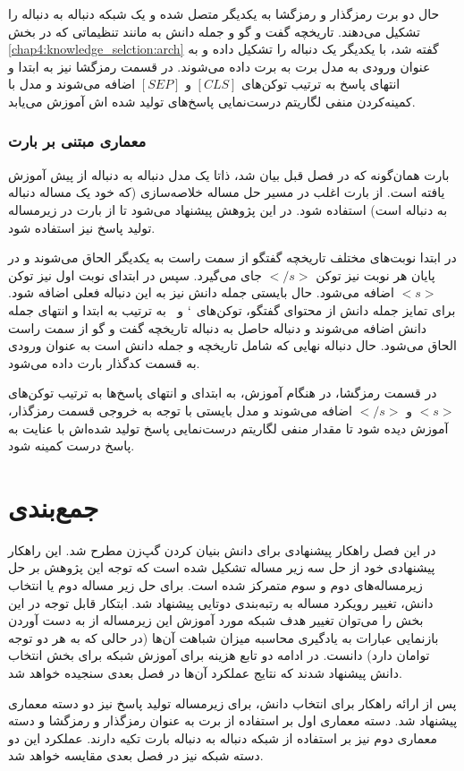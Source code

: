 حال دو برت رمزگذار و رمزگشا به یکدیگر متصل شده و یک شبکه دنباله به دنباله را تشکیل می‌دهند. تاریخچه گفت و گو و جمله دانش به مانند تنظیماتی که در 
بخش 
\ref{chap4:knowledge_selction:arch}
گفته شد، با یکدیگر یک دنباله را تشکیل داده و به عنوان ورودی به مدل برت به برت داده می‌شوند. در قسمت رمزگشا نیز به ابتدا و انتهای پاسخ به ترتیب توکن‌های
$[CLS]$
و
$[SEP]$
اضافه می‌شوند و مدل با کمینه‌کردن منفی لگاریتم درست‌نمایی پاسخ‌های تولید شده اش  آموزش می‌یابد.  

\subsubsection{معماری مبتنی بر بارت} \label{chap4:generation:bart}

بارت همان‌گونه که در فصل قبل بیان شد، ذاتا یک مدل دنباله به دنباله از پیش آموزش یافته است. از بارت اغلب در مسیر حل مساله خلاصه‌سازی (که خود یک مساله دنباله به دنباله است) استفاده شود. در این پژوهش پیشنهاد می‌شود تا از بارت در زیرمساله تولید پاسخ نیز استفاده شود. 

در ابتدا نوبت‌های مختلف تاریخچه گفتگو از سمت راست به یکدیگر الحاق می‌شوند و در پایان هر نوبت نیز توکن
$</s>$
جای می‌گیرد. سپس در ابتدای نوبت اول نیز توکن
$<s>$
اضافه می‌شود. حال بایستی جمله دانش نیز به این دنباله فعلی اضافه شود. برای تمایز جمله دانش از محتوای گفتگو، توکن‌های 
$`$
و
$~$
به ترتیب به ابتدا و انتهای جمله دانش اضافه می‌شوند و دنباله حاصل به دنباله تاریخچه گفت و گو از سمت راست الحاق می‌شود. حال دنباله نهایی که شامل تاریخچه و جمله دانش است به عنوان ورودی به قسمت کدگذار بارت داده می‌شود. 

در قسمت رمزگشا، در هنگام آموزش، به ابتدای و انتهای پاسخ‌ها به ترتیب توکن‌های 
$<s>$
و
$</s>$
اضافه می‌شوند و مدل بایستی با توجه به خروجی قسمت رمزگذار، آموزش دیده شود تا مقدار منفی لگاریتم درست‌نمایی پاسخ‌ تولید شده‌اش با عنایت به پاسخ درست کمینه شود.

\section{جمع‌بندی}
در این فصل راهکار پیشنهادی برای دانش بنیان کردن گپ‌زن مطرح شد. این راهکار پیشنهادی خود از حل سه زیر مساله تشکیل شده است که توجه این پژوهش بر حل زیرمساله‌های دوم و سوم متمرکز شده است. برای حل زیر مساله دوم یا انتخاب دانش، تغییر رویکرد مساله به رتبه‌بندی دوتایی پیشنهاد شد. ابتکار قابل توجه در این بخش را می‌توان تغییر هدف شبکه مورد آموزش این زیرمساله از به دست آوردن بازنمایی عبارات به یادگیری محاسبه میزان شباهت آن‌ها (در حالی که به هر دو توجه توامان دارد) دانست. در ادامه دو تابع هزینه برای آموزش شبکه برای بخش انتخاب دانش پیشنهاد شدند که نتایج عملکرد آن‌ها در فصل بعدی سنجیده خواهد شد.

پس از ارائه راهکار برای انتخاب دانش، برای زیرمساله تولید پاسخ نیز دو دسته معماری پیشنهاد شد. دسته‌ معماری اول بر استفاده از برت به عنوان رمزگذار و رمزگشا و دسته معماری دوم نیز بر استفاده از شبکه دنباله به دنباله بارت تکیه دارند. عملکرد این دو دسته شبکه نیز در فصل بعدی مقایسه خواهد شد. 

